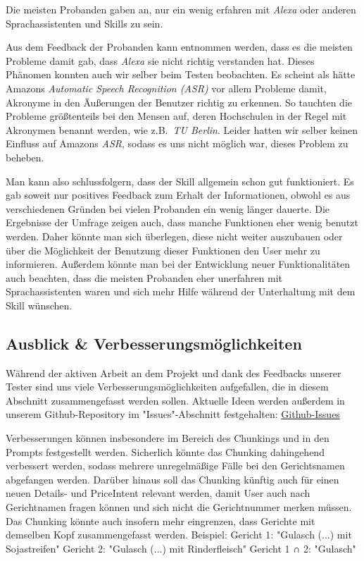 \documentclass[12pt]{article}
\begin{document}
Die meisten Probanden gaben an, nur ein wenig erfahren mit \emph{Alexa} oder anderen Sprachassistenten und Skills zu sein.

Aus dem Feedback der Probanden kann entnommen werden, dass es die meisten Probleme damit gab, dass \emph{Alexa} sie nicht richtig verstanden hat.
Dieses Phänomen konnten auch wir selber beim Testen beobachten.
Es scheint als hätte Amazons \emph{Automatic Speech Recognition (ASR)} vor allem Probleme damit, Akronyme in den Äußerungen der Benutzer richtig zu erkennen.
So tauchten die Probleme größtenteils bei den Mensen auf, deren Hochschulen in der Regel mit Akronymen benannt werden, wie z.B.~\emph{TU Berlin}.
Leider hatten wir selber keinen Einfluss auf Amazons \emph{ASR}, sodass es uns nicht möglich war, dieses Problem zu beheben.

Man kann also schlussfolgern, dass der Skill allgemein schon gut funktioniert.
Es gab soweit nur positives Feedback zum Erhalt der Informationen, obwohl es aus verschiedenen Gründen bei vielen Probanden ein wenig länger dauerte.
Die Ergebnisse der Umfrage zeigen auch, dass manche Funktionen eher wenig benutzt werden.
Daher könnte man sich überlegen, diese nicht weiter auszubauen oder über die Möglichkeit der Benutzung dieser Funktionen den User mehr zu informieren.
Außerdem könnte man bei der Entwicklung neuer Funktionalitäten auch beachten, dass die meisten Probanden eher unerfahren mit Sprachassistenten waren und sich mehr Hilfe während der Unterhaltung mit dem Skill wünschen.

\subsection{Ausblick \& Verbesserungsmöglichkeiten}

Während der aktiven Arbeit an dem Projekt und dank des Feedbacks unserer Tester sind uns viele Verbesserungsmöglichkeiten aufgefallen, die in diesem Abschnitt zusammengefasst werden sollen. Aktuelle Ideen werden außerdem in unserem Github-Repository im "Issues"-Abschnitt festgehalten: \href{https://github.com/mmonimon/mensa-skill/issues}{Github-Issues}

Verbesserungen können insbesondere im Bereich des Chunkings und in den Prompts festgestellt werden. Sicherlich könnte das Chunking dahingehend verbessert werden, sodass mehrere unregelmäßige Fälle bei den Gerichtsnamen abgefangen werden. Darüber hinaus soll das Chunking künftig auch für einen neuen Details- und PriceIntent relevant werden, damit User auch nach Gerichtnamen fragen können und sich nicht die Gerichtnummer merken müssen. Das Chunking könnte auch insofern mehr eingrenzen, dass Gerichte mit demselben Kopf zusammengefasst werden. 
Beispiel:
Gericht 1: "Gulasch (...) mit Sojastreifen"
Gericht 2: "Gulasch (...) mit Rinderfleisch"
Gericht 1 ∩ 2: "Gulasch"
\end{document}
